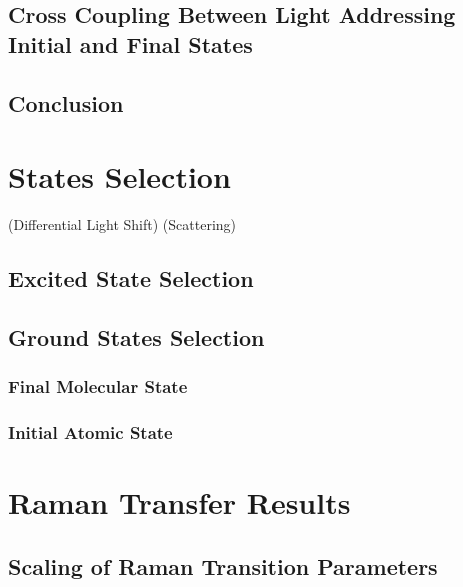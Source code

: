 \subsection{Cross Coupling Between Light Addressing Initial and Final States}

\subsection{Conclusion}

\section{States Selection}
\label{ch:raman-transfer:state-selction}

(Differential Light Shift)
(Scattering)

\subsection{Excited State Selection}

\subsection{Ground States Selection}

\subsubsection{Final Molecular State}

\subsubsection{Initial Atomic State}

\section{Raman Transfer Results}

\subsection{Scaling of Raman Transition Parameters}
